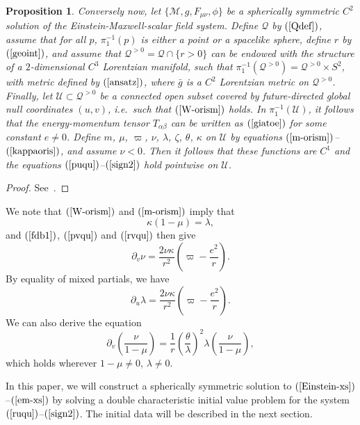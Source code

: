 \documentclass{article}
\newtheorem{proposition}[theorem]{Proposition}
\newcommand{\tl}{\frac{\theta}{\lambda}}
\begin{document}
\begin{proposition}
Conversely now, let $\{\mathcal{M}, g, F_{\mu\nu}, \phi\}$ be a 
spherically symmetric $C^2$ solution of the Einstein-Maxwell-scalar field
system. Define $\mathcal{Q}$ by $(\ref{Qdef})$, assume that
for all $p$, $\pi_1^{-1}(p)$
is either a point or a spacelike sphere,
define $r$ by $(\ref{geoint})$, and assume that 
$\mathcal{Q}^{>0}=\mathcal{Q}\cap\{r> 0\}$
can be endowed with the structure of a $2$-dimensional $C^3$ Lorentzian manifold,
such that $\pi_1^{-1}(\mathcal{Q}^{>0})=
\mathcal{Q}^{>0}\times S^2$, with metric defined by
$(\ref{ansatz})$, where $\bar{g}$ is a $C^2$ Lorentzian metric
on $\mathcal{Q}^{>0}$. Finally, let $\mathcal{U}\subset\mathcal{Q}^{>0}$ be a
connected
open subset covered by future-directed global null coordinates $(u,v)$,
i.e.~such that $(\ref{W-orism})$ holds. In $\pi_1^{-1}(\mathcal{U})$, 
it follows that
the energy-momentum tensor $T_{\alpha\beta}$ 
can be written as $(\ref{giatoe})$ for some
constant $e\ne0$.
Define 
$m$, $\mu$, $\varpi$, $\nu$, $\lambda$, $\zeta$, $\theta$, 
$\kappa$ on $\mathcal{U}$ by equations $(\ref{m-orism})$--$(\ref{kappaoris})$, 
and assume $\nu<0$. Then it
follows that these functions are $C^1$ and the equations $(\ref{puqu})$--$(\ref{sign2})$ hold pointwise on 
$\mathcal{U}$.
\end{proposition}

\begin{proof}
See~\cite{md:sssts, md:si}.
\end{proof}

We note that $(\ref{W-orism})$ and $(\ref{m-orism})$
imply that
\[
\kappa(1-\mu)=\lambda,
\]
and $(\ref{fdb1})$, $(\ref{pvqu})$ and $(\ref{rvqu})$ then give
\begin{equation}
\label{nqu}
\partial_v\nu=\frac{2\nu\kappa}{r^2}
\left(\varpi-\frac{e^2}{r}\right).
\end{equation}
By equality of mixed partials, we have
\begin{equation}
\label{lqu}
\partial_u\lambda=\frac{2\nu\kappa}{r^2}
\left(\varpi-\frac{e^2}{r}\right).
\end{equation}
We can also derive the equation
\begin{equation}
\label{fdb2}
\partial_v\left(\frac{\nu}{1-\mu}\right)=
\frac{1}r\left(\tl\right)^2\lambda\left(\frac{\nu}{1-\mu}\right),
\end{equation}
which holds wherever $1-\mu\ne0$, $\lambda\ne0$.


In this paper, we will
construct a spherically symmetric solution to $(\ref{Einstein-xs})$--$(\ref{em-xs})$ by
solving a double characteristic initial value problem for the system
$(\ref{ruqu})$--$(\ref{sign2})$. 
The initial data will be described in the next section.
\end{document}
